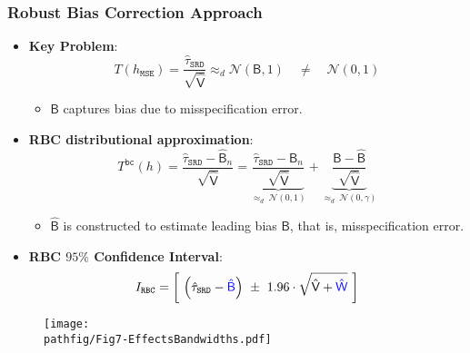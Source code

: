 \documentclass[9pt]{beamer}
\newcommand{\pathfig}{figures}
\begin{document}
\begin{frame}\frametitle{Robust Bias Correction Approach}
	\begin{itemize}
		\item \textbf{Key Problem}:
		\[T(h_{\mathtt{MSE}})=\frac{\hat{\tau}_{\mathtt{SRD}}}{\sqrt{\mathsf{\hat{V}}}}\approx_{d}\mathcal{N}(\mathsf{B},1)\quad\neq\quad\mathcal{N}(0,1)\]
		\begin{itemize}
			\item $\mathsf{B}$ captures bias due to misspecification error.\bigskip
		\end{itemize}
		
		\item \textbf{RBC distributional approximation}:
		\[T^{\mathtt{bc}}(h)
		  = \frac{\hat{\tau}_{\mathtt{SRD}}-\mathsf{\hat{B}}_{n}}{\sqrt{\mathsf{\hat{V}}}}
		  = \underset{\approx_{d}~\mathcal{N}(0,1)}{\underbrace{\frac{\hat{\tau}_{\mathtt{SRD}}-\mathsf{B}_{n}}{\sqrt{\mathsf{\hat{V}}}}}}
		    + \underset{\approx_{d}~\mathcal{N}(0,\gamma)}{\underbrace{\frac{\mathsf{B}-\mathsf{\hat{B}}}{\sqrt{\mathsf{\hat{V}}}}}}%
		\]
		\begin{itemize}
			\item $\mathsf{\hat{B}}$ is constructed to estimate leading bias $\mathsf{B}$, that is, misspecification error.\bigskip
		\end{itemize}

		\item \textbf{RBC $95\%$ Confidence Interval}:
		\[I_{\mathtt{RBC}} = \left[ ~\left(\hat{\tau}_{\mathtt{SRD}}-\color{blue} \mathsf{\hat{B}}\color{black}\right)
		~\pm~ 1.96\cdot\sqrt{\mathsf{\hat{V}} + \color{blue} \mathsf{\hat{W}}\color{black}} ~\right]
		\]		
	\end{itemize}
\end{frame}

\begin{frame}
	\begin{figure}[h]
		\centering\texttt{[image: \\pathfig/Fig7-EffectsBandwidths.pdf]}
	\end{figure}
\end{frame}
\end{document}
